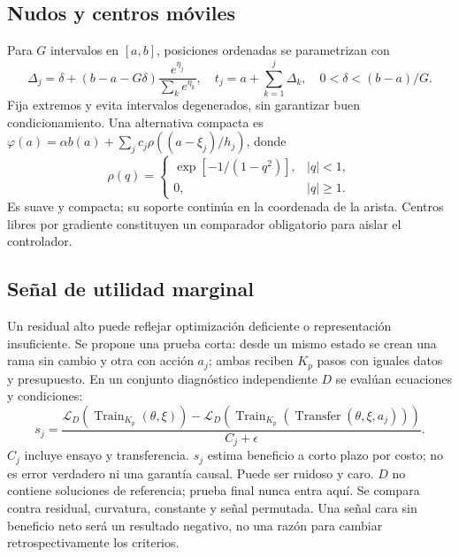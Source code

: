 \subsection{Nudos y centros móviles}
Para $G$ intervalos en $[a,b]$, posiciones ordenadas se parametrizan con
\begin{equation}\Delta_j=\delta+(b-a-G\delta)\frac{e^{\eta_j}}{\sum_ke^{\eta_k}},\quad t_j=a+\sum_{k=1}^j\Delta_k,\quad0<\delta<(b-a)/G.\end{equation}
Fija extremos y evita intervalos degenerados, sin garantizar buen condicionamiento. Una alternativa compacta es $\varphi(a)=\alpha b(a)+\sum_jc_j\rho((a-\xi_j)/h_j)$, donde
\begin{equation}\rho(q)=\begin{cases}\exp[-1/(1-q^2)],&|q|<1,\\0,&|q|\geq1.\end{cases}\end{equation}
Es suave y compacta; su soporte continúa en la coordenada de la arista. Centros libres por gradiente constituyen un comparador obligatorio para aislar el controlador.

\subsection{Señal de utilidad marginal}
Un residual alto puede reflejar optimización deficiente o representación insuficiente. Se propone una prueba corta: desde un mismo estado se crean una rama sin cambio y otra con acción $a_j$; ambas reciben $K_p$ pasos con iguales datos y presupuesto. En un conjunto diagnóstico independiente $D$ se evalúan ecuaciones y condiciones:
\begin{equation}
s_j=\frac{\mathcal L_D(\operatorname{Train}_{K_p}(\theta,\xi))-\mathcal L_D(\operatorname{Train}_{K_p}(\operatorname{Transfer}(\theta,\xi,a_j)))}{C_j+\epsilon}.
\label{eq:signal}\end{equation}
$C_j$ incluye ensayo y transferencia. $s_j$ estima beneficio a corto plazo por costo; no es error verdadero ni una garantía causal. Puede ser ruidoso y caro. $D$ no contiene soluciones de referencia; prueba final nunca entra aquí. Se compara contra residual, curvatura, constante y señal permutada. Una señal cara sin beneficio neto será un resultado negativo, no una razón para cambiar retrospectivamente los criterios.


